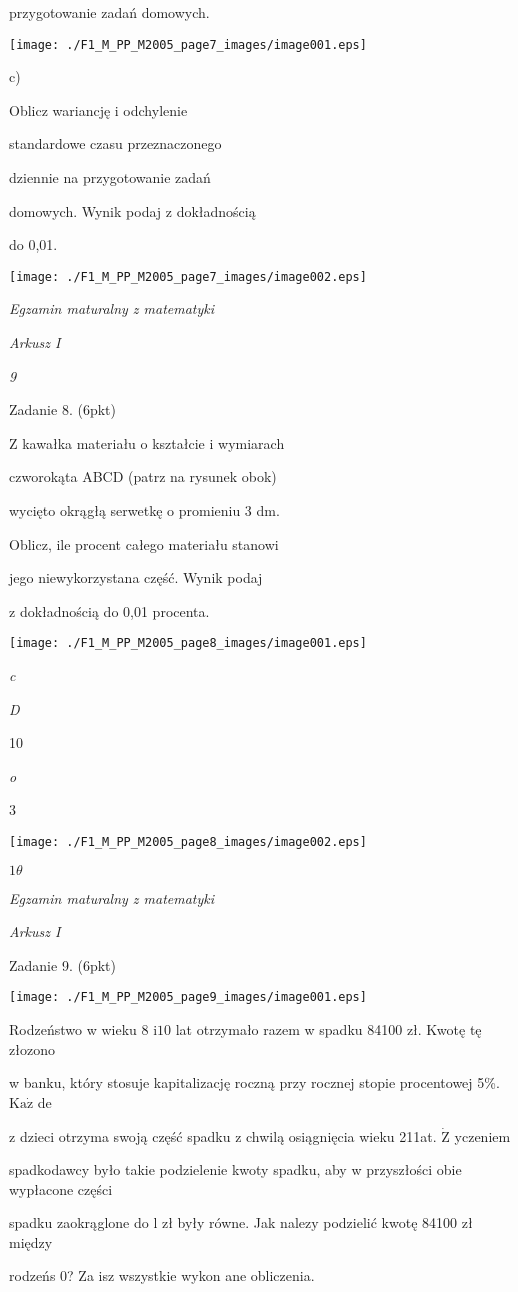 \documentclass[a4paper,12pt]{article}
\begin{document}
przygotowanie zadań domowych.
\begin{center}
\texttt{[image: ./F1\_M\_PP\_M2005\_page7\_images/image001.eps]}
\end{center}
c)

Oblicz wariancję i odchylenie

standardowe czasu przeznaczonego

dziennie na przygotowanie zadań

domowych. Wynik podaj z dokładnością

do 0,01.
\begin{center}
\texttt{[image: ./F1\_M\_PP\_M2005\_page7\_images/image002.eps]}
\end{center}




{\it Egzamin maturalny z matematyki}

{\it Arkusz I}

{\it 9}

Zadanie 8. (6pkt)

Z kawałka materiału o kształcie i wymiarach

czworokąta ABCD (patrz na rysunek obok)

wycięto okrągłą serwetkę o promieniu 3 dm.

Oblicz, ile procent całego materiału stanowi

jego niewykorzystana część. Wynik podaj

z dokładnością do 0,01 procenta.
\begin{center}
\texttt{[image: ./F1\_M\_PP\_M2005\_page8\_images/image001.eps]}
\end{center}
{\it c}

{\it D}

10

{\it o}

3
\begin{center}
\texttt{[image: ./F1\_M\_PP\_M2005\_page8\_images/image002.eps]}
\end{center}




$ 1\theta$

{\it Egzamin maturalny z matematyki}

{\it Arkusz I}

Zadanie 9. (6pkt)
\begin{center}
\texttt{[image: ./F1\_M\_PP\_M2005\_page9\_images/image001.eps]}
\end{center}
Rodzeństwo w wieku 8 $\mathrm{i} 10$ lat otrzymało razem w spadku 84100 zł. Kwotę tę złozono

w banku, który stosuje kapitalizację roczną przy rocznej stopie procentowej 5\%. $\mathrm{K}\mathrm{a}\dot{\mathrm{z}}$ de

z dzieci otrzyma swoją część spadku z chwilą osiągnięcia wieku 211at. $\dot{\mathrm{Z}}$ yczeniem

spadkodawcy było takie podzielenie kwoty spadku, aby w przyszłości obie wypłacone części

spadku zaokrąglone do l zł były równe. Jak nalez$\mathrm{y}$ podzielić kwotę 84100 zł między

rodzeńs $0$? Za isz wszystkie wykon ane obliczenia.
\end{document}
